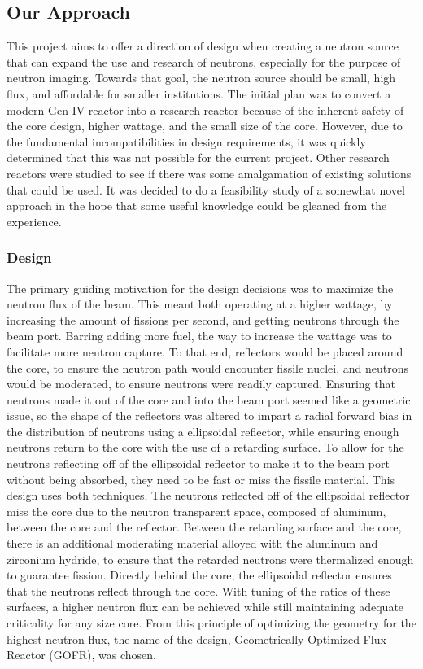 \subsection{Our Approach}

This project aims to offer a direction of design when creating a neutron source that can expand the use and research of neutrons, especially for the purpose of neutron imaging. Towards that goal, the neutron source should be small, high flux, and affordable for smaller institutions. The initial plan was to convert a modern Gen IV reactor into a research reactor because of the inherent safety of the core design, higher wattage, and the small size of the core. However, due to the fundamental incompatibilities in design requirements, it was quickly determined that this was not possible for the current project. Other research reactors were studied to see if there was some amalgamation of existing solutions that could be used. It was decided to do a feasibility study of a somewhat novel approach in the hope that some useful knowledge could be gleaned from the experience.

\subsubsection{Design}

The primary guiding motivation for the design decisions was to maximize the neutron flux of the beam. This meant both operating at a higher wattage, by increasing the amount of fissions per second, and getting neutrons through the beam port. Barring adding more fuel, the way to increase the wattage was to facilitate more neutron capture. To that end, reflectors would be placed around the core, to ensure the neutron path would encounter fissile nuclei, and neutrons would be moderated, to ensure neutrons were readily captured. Ensuring that neutrons made it out of the core and into the beam port seemed like a geometric issue, so the shape of the reflectors was altered to impart a radial forward bias in the distribution of neutrons using a ellipsoidal reflector, while ensuring enough neutrons return to the core with the use of a retarding surface. To allow for the neutrons reflecting off of the ellipsoidal reflector to make it to the beam port without being absorbed, they need to be fast or miss the fissile material. This design uses both techniques. The neutrons reflected off of the ellipsoidal reflector miss the core due to the neutron transparent space, composed of aluminum, between the core and the reflector. Between the retarding surface and the core, there is an additional moderating material alloyed with the aluminum and zirconium hydride, to ensure that the retarded neutrons were thermalized enough to guarantee fission. Directly behind the core, the ellipsoidal reflector ensures that the neutrons reflect through the core. With tuning of the ratios of these surfaces, a higher neutron flux can be achieved while still maintaining adequate criticality for any size core. From this principle of optimizing the geometry for the highest neutron flux, the name of the design, Geometrically Optimized Flux Reactor (GOFR), was chosen.


